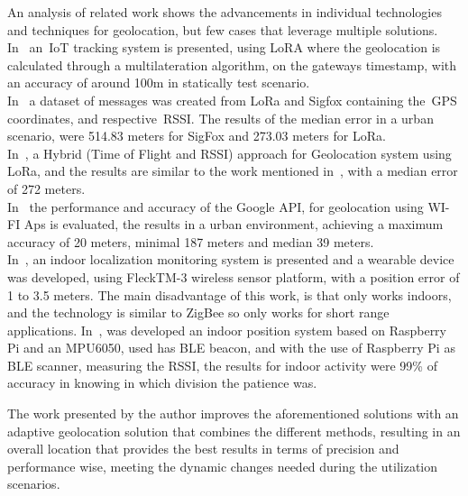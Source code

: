 An analysis of related work shows the advancements in individual technologies and techniques for geolocation, but few cases that leverage multiple solutions.\\
In~\cite{Fargas2017RL1} an~\gls{IoT} tracking system is presented, using LoRA where the geolocation is calculated through a multilateration algorithm, on the gateways timestamp, with an accuracy of around 100m in statically test scenario.\\
In~\cite{Aernouts2018RL2} a dataset of messages was created from LoRa and Sigfox containing the~\gls{GPS} coordinates, and respective~\gls{RSSI}. The results of the median error in a urban scenario, were 514.83 meters for SigFox and 273.03 meters for LoRa.\\ 
In~\cite{Danebjer2018}, a Hybrid (Time of Flight and RSSI) approach for Geolocation system using LoRa,  and the results are similar to the work mentioned in~\cite{Aernouts2018RL2}, with a median error of 272 meters.\\
In~\cite{RL3} the performance and accuracy of the Google API, for geolocation using WI-FI Aps is evaluated, the results in a urban environment, achieving a maximum accuracy of 20 meters, minimal 187 meters and median 39 meters.\\
In~\cite{DSouza2012RL4}, an  indoor localization monitoring system is presented and a wearable device was developed, using FleckTM-3 wireless sensor platform, with a position error of 1 to 3.5 meters. The main disadvantage of this work, is that only works indoors, and the technology is similar to ZigBee so only works for short range applications.
In~\cite{Tabbakha2018}, was developed an indoor position system based on Raspberry Pi and an MPU6050, used has BLE beacon, and with the use of Raspberry Pi as BLE scanner, measuring the RSSI, the results for indoor activity were 99\% of accuracy in knowing in which division the patience was.

The work presented by the author improves the aforementioned solutions with an adaptive geolocation solution that combines the different methods, resulting in an overall location that provides the best results in terms of precision and performance wise, meeting the dynamic changes needed during the utilization scenarios.


